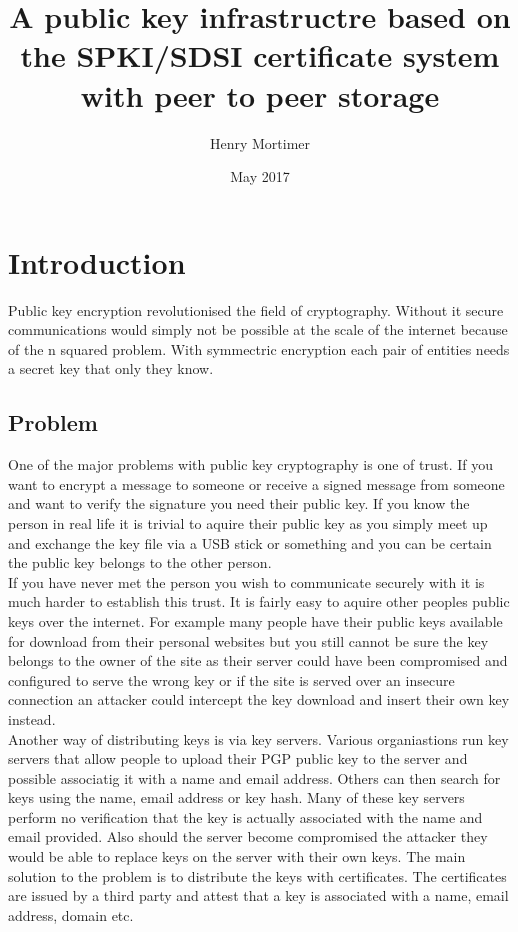 \documentclass[12pt, a4paper]{article}
\begin{document}
\title{A public key infrastructre based on the SPKI/SDSI certificate system with peer to peer storage}
\author{Henry Mortimer}
\date{May 2017}
\maketitle

\tableofcontents
\clearpage

\section{Introduction}
Public key encryption revolutionised the field of cryptography. Without it secure communications would simply not be possible at the scale of the internet because of the n squared problem. With symmectric encryption each pair of entities needs a secret key that only they know. 
\subsection{Problem}
One of the major problems with public key cryptography is one of trust. If you want to encrypt a message to someone or receive a signed message from someone and want to verify the signature you need their public key. If you know the person in real life it is trivial to aquire their public key as you simply meet up and exchange the key file via a USB stick or something and you can be certain the public key belongs to the other person. \\ 
If you have never met the person you wish to communicate securely with it is much harder to establish this trust. It is fairly easy to aquire other peoples public keys over the internet. For example many people have their public keys available for download from their personal websites but you still cannot be sure the key belongs to the owner of the site as their server could have been compromised and configured to serve the wrong key or if the site is served over an insecure connection an attacker could intercept the key download and insert their own key instead.\\
Another way of distributing keys is via key servers. Various organiastions run key servers that allow people to upload their PGP public key to the server and possible associatig it with a name and email address. Others can then search for keys using the name, email address or key hash. Many of these key servers perform no verification that the key is actually associated with the name and email provided. Also should the server become compromised the attacker they would be able to replace keys on the server with their own keys.
The main solution to the problem is to distribute the keys with certificates. The certificates are issued by a third party and attest that a key is associated with a name, email address, domain etc.\\
\end{document}
